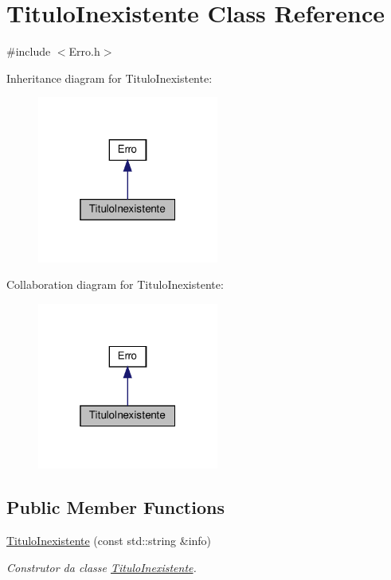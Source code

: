 \hypertarget{classTituloInexistente}{}\section{Titulo\+Inexistente Class Reference}
\label{classTituloInexistente}


{\ttfamily \#include $<$Erro.\+h$>$}



Inheritance diagram for Titulo\+Inexistente\+:
\nopagebreak
\begin{figure}[H]
\begin{center}
\leavevmode
\includegraphics[width=169pt]{classTituloInexistente__inherit__graph}
\end{center}
\end{figure}


Collaboration diagram for Titulo\+Inexistente\+:
\nopagebreak
\begin{figure}[H]
\begin{center}
\leavevmode
\includegraphics[width=169pt]{classTituloInexistente__coll__graph}
\end{center}
\end{figure}
\subsection*{Public Member Functions}
\begin{DoxyCompactItemize}
\item 
\hyperlink{classTituloInexistente_a0404090789fc608b5a08027bba811784}{Titulo\+Inexistente} (const std\+::string \&info)
\begin{DoxyCompactList}\small\item\em Construtor da classe \hyperlink{classTituloInexistente}{Titulo\+Inexistente}. \end{DoxyCompactList}\end{DoxyCompactItemize}



